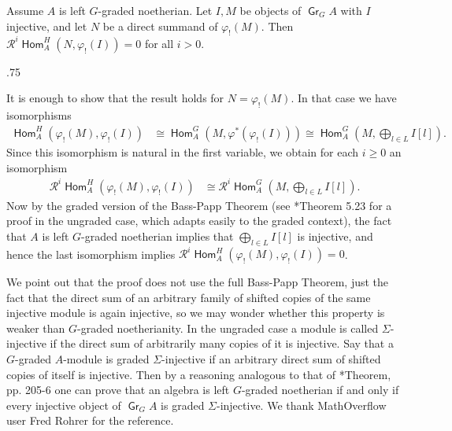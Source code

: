 \documentclass[11pt,fleqn]{article}
\makeatletter
\renewenvironment{proof}[1][\textit{Proof}]{\par
 \pushQED{\qed}%
 \normalfont \topsep.75\paraskip\relax
 \trivlist
 \item[\hskip\labelsep
    \itshape
  #1\@addpunct{.}]\ignorespaces
}{%
 \popQED\endtrivlist\@endpefalse
}
\renewcommand\phi{\varphi}
\newcommand\R{\mathcal R}
\DeclareMathOperator\Gr{\mathsf{Gr}}
\DeclareMathOperator\Hom{\mathsf{Hom}}
\makeatother
\begin{document}
\label{L:acyclic}
\begin{Lemma*}
Assume $A$ is left $G$-graded noetherian. Let $I, M$ be objects of $\Gr_G A$ 
with $I$ injective, and let $N$ be a direct summand of $\phi_!(M)$. Then 
$\R^i\Hom_A^H(N, \phi_!(I)) = 0$ for all $i > 0$.
\end{Lemma*}
\begin{proof}
It is enough to show that the result holds for $N = \phi_!(M)$. In that case 
we have isomorphisms
\begin{align*}
\Hom_A^H(\phi_!(M), \phi_!(I)) 
 &\cong \Hom_A^G(M, \phi^*(\phi_!(I)))
 \cong \Hom_A^G\left(M, \bigoplus_{l \in L} I[l] \right).
\end{align*}
Since this isomorphism is natural in the first variable, we obtain for each 
$i \geq 0$ an isomorphism
\begin{align*}
\R^i \Hom_A^H(\phi_!(M), \phi_!(I)) 
 &\cong\R^i\Hom_A^G\left(M, \bigoplus_{l \in L} I[l] \right).
\end{align*}
Now by the graded version of the Bass-Papp Theorem (see 
\cite{GW-noetherian-book}*{Theorem 5.23} for a proof in 
the ungraded case, which adapts easily to the graded context), the fact that 
$A$ is left $G$-graded noetherian implies that $\bigoplus_{l \in L} I[l]$ is 
injective, and hence the last isomorphism implies $\R^i \Hom_A^H(\phi_!(M), 
\phi_!(I)) = 0$.
\end{proof}

\begin{Remark*}
We point out that the proof does not use the full Bass-Papp Theorem, just the
fact that the direct sum of an arbitrary family of shifted copies of the same 
injective module is again injective, so we may wonder whether this property is 
weaker than $G$-graded noetherianity. In the ungraded case a module is called 
$\Sigma$-injective if the direct sum of arbitrarily many copies of it is
injective. Say that a $G$-graded $A$-module is graded $\Sigma$-injective if an
arbitrary direct sum of shifted copies of itself is injective. Then by a 
reasoning analogous to that of \cite{FW-direcsumreps}*{Theorem, pp. 205-6}
one can prove that an algebra is left $G$-graded noetherian if and only if
every injective object of $\Gr_G A$ is graded $\Sigma$-injective. We thank
MathOverflow user Fred Rohrer for the reference.
\end{Remark*}
\end{document}
